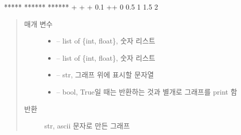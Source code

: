 \documentclass[letterpaper,10pt,english]{sphinxmanual}
\begin{document}
\begin{fulllineitems}
\begin{sphinxVerbatim}[commandchars=\\\{\}]
     \textbar{}              *****                                                           \textbar{}
     \textbar{}        ******                                                                \textbar{}
     \textbar{}  ******           +                   +                  +                   \textbar{}
 0.1 +\PYGZhy{}\PYGZhy{}\PYGZhy{}\PYGZhy{}\PYGZhy{}\PYGZhy{}\PYGZhy{}\PYGZhy{}\PYGZhy{}\PYGZhy{}\PYGZhy{}\PYGZhy{}\PYGZhy{}\PYGZhy{}\PYGZhy{}\PYGZhy{}\PYGZhy{}\PYGZhy{}\PYGZhy{}\PYGZhy{}\PYGZhy{}\PYGZhy{}\PYGZhy{}\PYGZhy{}\PYGZhy{}\PYGZhy{}\PYGZhy{}\PYGZhy{}\PYGZhy{}\PYGZhy{}\PYGZhy{}\PYGZhy{}\PYGZhy{}\PYGZhy{}\PYGZhy{}\PYGZhy{}\PYGZhy{}\PYGZhy{}\PYGZhy{}\PYGZhy{}\PYGZhy{}\PYGZhy{}\PYGZhy{}\PYGZhy{}\PYGZhy{}\PYGZhy{}\PYGZhy{}\PYGZhy{}\PYGZhy{}\PYGZhy{}\PYGZhy{}\PYGZhy{}\PYGZhy{}\PYGZhy{}\PYGZhy{}\PYGZhy{}\PYGZhy{}\PYGZhy{}\PYGZhy{}\PYGZhy{}\PYGZhy{}\PYGZhy{}\PYGZhy{}\PYGZhy{}\PYGZhy{}\PYGZhy{}\PYGZhy{}\PYGZhy{}\PYGZhy{}\PYGZhy{}\PYGZhy{}\PYGZhy{}\PYGZhy{}\PYGZhy{}\PYGZhy{}\PYGZhy{}\PYGZhy{}\PYGZhy{}+
     0                  0.5                  1                 1.5                  2
\end{sphinxVerbatim}
\begin{quote}\begin{description}
\item[{매개 변수}] \leavevmode\begin{itemize}
\item {} 
 -- list of \{int, float\}, 숫자 리스트

\item {} 
 -- list of \{int, float\}, 숫자 리스트

\item {} 
 -- str, 그래프 위에 표시할 문자열

\item {} 
 -- bool, True일 때는 반환하는 것과 별개로 그래프를 print 함

\end{itemize}

\item[{반환}] \leavevmode
str, ascii 문자로 만든 그래프

\end{description}\end{quote}

\end{fulllineitems}
\end{document}
